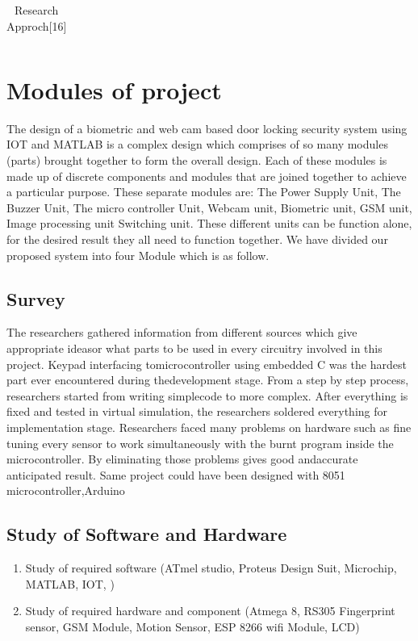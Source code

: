 \documentclass[twoside,a4paper,16pt]{book}
\begin{document}
{{\begin{center}
\begin{table}[h!]
\begin{tabular}{|p{.8cm}|p{3cm}|p{3cm}|p{3cm}|p{4.5cm}|p{1cm}|}
			
			
			\hline
			
		\end{tabular}
		\caption{Research Approch[16]}	
	\end{table}
	
\end{center}
\newpage
\section{Modules of project }
The design of a biometric and web cam based door locking security system using IOT and MATLAB is a complex design which
comprises of so many modules (parts) brought together to form the overall design. Each of these modules is
made up of discrete components and modules that are joined together to achieve a particular purpose. 
These separate modules are: The Power Supply Unit, The Buzzer Unit, The micro controller Unit, Webcam unit, Biometric unit, GSM unit, Image processing unit
Switching unit.
These different units can be function alone, for the desired result they all need to function together. We have divided our proposed system into four Module which is as follow.
\subsection{Survey}
The researchers gathered information from different sources which give appropriate ideasor what parts to be used in every circuitry involved in this project. Keypad interfacing tomicrocontroller using embedded C was the hardest part ever encountered during thedevelopment stage. From a step by step process, researchers started from writing simplecode to more complex. After everything is fixed and tested in virtual simulation, the researchers soldered everything for implementation stage. Researchers faced many problems on hardware such as fine tuning every sensor to work simultaneously with the burnt program inside the microcontroller. By eliminating those problems gives good andaccurate anticipated result. Same project could have been designed with 8051 microcontroller,Arduino
\subsection{Study of Software and Hardware}
\begin{enumerate}
	\item Study of required software (ATmel studio, Proteus Design Suit, Microchip, MATLAB, IOT, )
	\item Study of required hardware and component (Atmega 8, RS305 Fingerprint sensor, GSM Module, Motion Sensor, ESP 8266 wifi Module, LCD)
\end{enumerate}
}}
\end{document}
